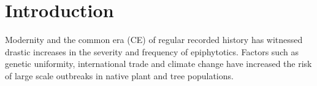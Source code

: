 
\chapter{Introduction} %


Modernity and the common era (CE) of regular recorded history has witnessed drastic increases in the severity and frequency of epiphytotics. Factors such as genetic uniformity, international trade and climate change have increased the risk of large scale outbreaks in native plant and tree populations.

